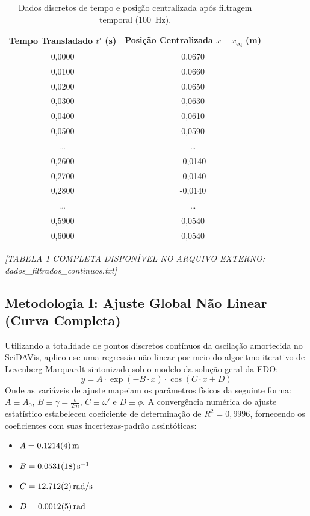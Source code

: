 \documentclass[12pt, a4paper]{article}
\begin{document}
\begin{table}[H]
    \centering
    \caption{Dados discretos de tempo e posição centralizada após filtragem temporal (\SI{100}{\hertz}).}
    \label{tab:dados_brutos_filtrados}
    \begin{tabular}{cc}
        \toprule
        \textbf{Tempo Transladado $t'$ (\si{\second})} & \textbf{Posição Centralizada $x - x_{\text{eq}}$ (\si{\meter})} \\
        \midrule
        0,0000 & 0,0670 \\
        0,0100 & 0,0660 \\
        0,0200 & 0,0650 \\
        0,0300 & 0,0630 \\
        0,0400 & 0,0610 \\
        0,0500 & 0,0590 \\
        \dots  & \dots  \\
        0,2600 & -0,0140 \\
        0,2700 & -0,0140 \\
        0,2800 & -0,0140 \\
        \dots  & \dots  \\
        0,5900 & 0,0540 \\
        0,6000 & 0,0540 \\
        \bottomrule
    \end{tabular}
    \vskip 4pt
    \centering \small \textit{[TABELA 1 COMPLETA DISPONÍVEL NO ARQUIVO EXTERNO: dados\_filtrados\_continuos.txt]}
\end{table}

\subsection{Metodologia I: Ajuste Global Não Linear (Curva Completa)}
Utilizando a totalidade de pontos discretos contínuos da oscilação amortecida no SciDAVis, aplicou-se uma regressão não linear por meio do algoritmo iterativo de Levenberg-Marquardt sintonizado sob o modelo da solução geral da EDO:
\begin{equation}
    y = A \cdot \exp(-B \cdot x) \cdot \cos(C \cdot x + D)
\end{equation}
Onde as variáveis de ajuste mapeiam os parâmetros físicos da seguinte forma: $A \equiv A_0$, $B \equiv \gamma = \frac{b}{2m}$, $C \equiv \omega'$ e $D \equiv \phi$. A convergência numérica do ajuste estatístico estabeleceu coeficiente de determinação de $R^2 = 0,9996$, fornecendo os coeficientes com suas incertezas-padrão assintóticas:
\begin{itemize}
    \item $A = \SI{0,1214 \pm 0,0004}{\meter}$
    \item $B = \SI{0,0531 \pm 0,0018}{\second^{-1}}$
    \item $C = \SI{12,712 \pm 0,002}{\text{rad}/\second}$
    \item $D = \SI{0,0012 \pm 0,0005}{\text{rad}}$
\end{itemize}
\end{document}
